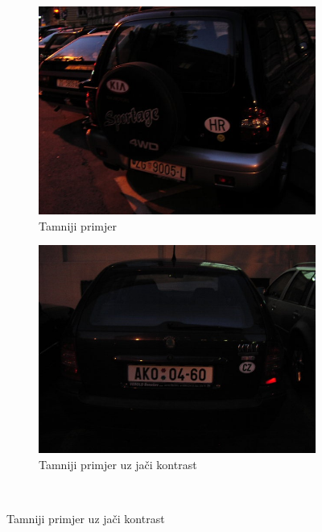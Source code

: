 \documentclass[times, utf8, diplomski]{fer}
\begin{document}
\begin{figure}[H]
     \centering
     \begin{subfigure}[b]{0.4\textwidth}
         \centering
         \includegraphics[width=\textwidth]{figures/ce_examples/1/original.jpg}
         \caption{Tamniji primjer}
     \end{subfigure}
     \hspace{1cm}
     \begin{subfigure}[b]{0.4\textwidth}
         \centering
         \includegraphics[width=\textwidth]{figures/ce_examples/2/original.jpg}
         \caption{Tamniji primjer uz jači kontrast}
     \end{subfigure}\\[0.5cm]

\end{figure}
\end{document}
